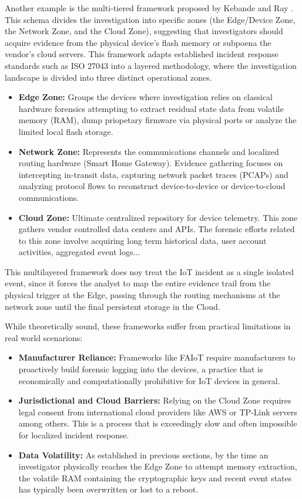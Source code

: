 Another example is the multi-tiered framework proposed by Kebande and Ray \cite{Kebande2016}. This schema divides the investigation into specific zones (the Edge/Device Zone, the Network Zone, and the Cloud Zone), suggesting that investigators should acquire evidence from the physical device's flash memory or subpoena the vendor's cloud servers. This framework adapts established incident response standards such as ISO 27043 into a layered methodology, where the investigation landscape is divided into three distinct operational zones. 

\begin{itemize}
	\item \textbf{Edge Zone:} Groups the devices where investigation relies on classical hardware forensics attempting to extract residual state data from volatile memory (RAM), dump priopetary firmware via physical ports or analyze the limited local flash storage.
	\item \textbf{Network Zone:} Represents the communications channels and localized routing hardware (Smart Home Gateway). Evidence gathering focuses on intercepting in-transit data, capturing network packet traces (PCAPs) and analyzing protocol flows to reconstruct device-to-device or device-to-cloud communications.
	\item \textbf{Cloud Zone:} Ultimate centralized repository for device telemetry. This zone gathers vendor controlled data centers and APIs. The forensic efforts related to this zone involve acquiring long term historical data, user account activities, aggregated event logs...
\end{itemize}

This multilayered framework does noy treat the IoT incident as a single isolated event, since it forces the analyst to map the entire evidence trail from the physical trigger at the Edge, passing through the routing mechanisms at the network zone until the final persistent storage in the Cloud.

While theoretically sound, these frameworks suffer from practical limitations in real world scenarions:

\begin{itemize}
	\item \textbf{Manufacturer Reliance:} Frameworks like FAIoT require manufacturers to proactively build forensic logging into the devices, a practice that is economically and computationally prohibitive for IoT devices in general. 
	\item \textbf{Jurisdictional and Cloud Barriers:} Relying on the Cloud Zone requires legal consent from international cloud providers like AWS or TP-Link servers among others. This is a process that is exceedingly slow and often impossible for localized incident response.
	\item \textbf{Data Volatility:} As established in previous sections, by the time an investigator physically reaches the Edge Zone to attempt memory extraction, the volatile RAM containing the cryptographic keys and recent event states has typically been overwritten or lost to a reboot.
\end{itemize}

